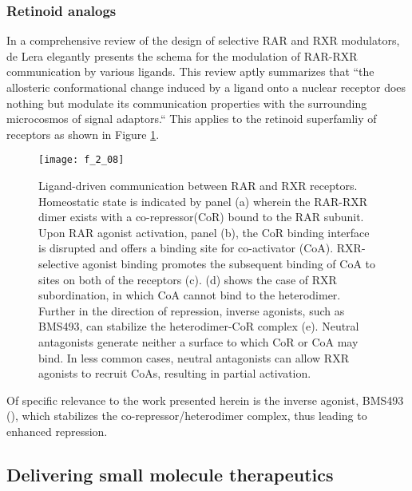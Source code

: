 \begin{refsection}
\subsubsection{Retinoid analogs}

In a comprehensive review of the design of selective RAR and RXR modulators, de
Lera  elegantly presents the schema for the modulation of RAR-RXR
communication by various ligands. This review aptly summarizes that ``the
allosteric conformational change induced by a ligand onto a nuclear receptor
does nothing but modulate its communication properties with the surrounding
microcosmos of signal adaptors.``\cite{DeLera2007} This applies to the retinoid
superfamliy of receptors as shown in Figure \ref{fig:RAR_communication}.
\begin{figure}[h!] \centering \texttt{[image: f\_2\_08]}
    \caption[Ligand-driven communication between RAR and RXR
    receptors.]{Ligand-driven communication between RAR and RXR receptors.
        Homeostatic state is indicated by panel (a) wherein the RAR-RXR dimer
        exists with a co-repressor(CoR) bound to the RAR subunit. Upon RAR
        agonist activation, panel (b), the CoR binding interface is disrupted
        and offers a binding site for co-activator (CoA). RXR-selective agonist
        binding promotes the subsequent binding of CoA to sites on both of the
        receptors (c). (d) shows the case of RXR subordination, in which CoA
        cannot bind to the heterodimer. Further in the direction of repression,
        inverse agonists, such as BMS493, can stabilize the heterodimer-CoR
        complex (e). Neutral antagonists generate neither a surface to which CoR or
        CoA may bind. In less common cases, neutral antagonists can allow RXR
        agonists to recruit CoAs, resulting in partial activation.\cite{DeLera2007}}\label{fig:RAR_communication} \end{figure}
Of specific relevance to the work presented herein is the inverse agonist,
BMS493 (), which
stabilizes the co-repressor/heterodimer complex, thus leading to enhanced
repression.\cite{Germain2002} 

\subsection{Delivering small molecule therapeutics}


\end{refsection}
